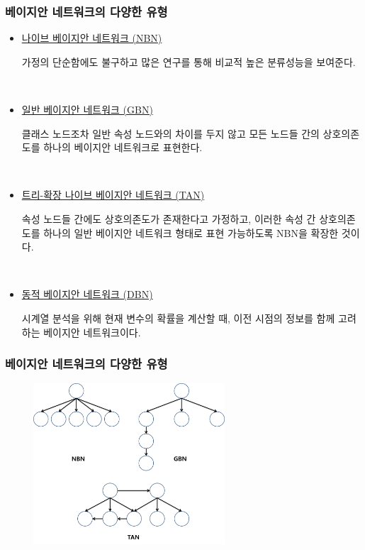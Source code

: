 \documentclass{beamer}
\begin{document}
\begin{frame}
\frametitle{베이지안 네트워크의 다양한 유형}
{\scriptsize{}
	\begin{itemize}

		\item \underline{나이브 베이지안 네트워크 (NBN)}
		
		가정의 단순함에도 불구하고 많은 연구를 통해 비교적 높은 분류성능을 보여준다.
	
		{}\	
		
		\item \underline{일반 베이지안 네트워크 (GBN)}
		
		클래스 노드조차 일반 속성 노드와의 차이를 두지 않고 모든 노드들 간의 상호의존도를 하나의 베이지안 네트워크로 표현한다.
		
		{}\		
		
		\item \underline{트리-확장 나이브 베이지안 네트워크 (TAN)}

		속성 노드들 간에도 상호의존도가 존재한다고 가정하고, 이러한 속성 간 상호의존도를 하나의 일반 베이지안 네트워크 형태로 표현 가능하도록 NBN을 확장한 것이다.

		{}\		
		
		\item \underline{동적 베이지안 네트워크 (DBN)}

		시계열 분석을 위해 현재 변수의 확률을 계산할 때, 이전 시점의 정보를 함께 고려하는 베이지안 네트워크이다.

	\end{itemize}
}
\end{frame}



\begin{frame}[fragile]
\frametitle{베이지안 네트워크의 다양한 유형}

	\begin{figure}
		\includegraphics[height=170pt]{images/image109}
	\end{figure}

\end{frame}
\end{document}
